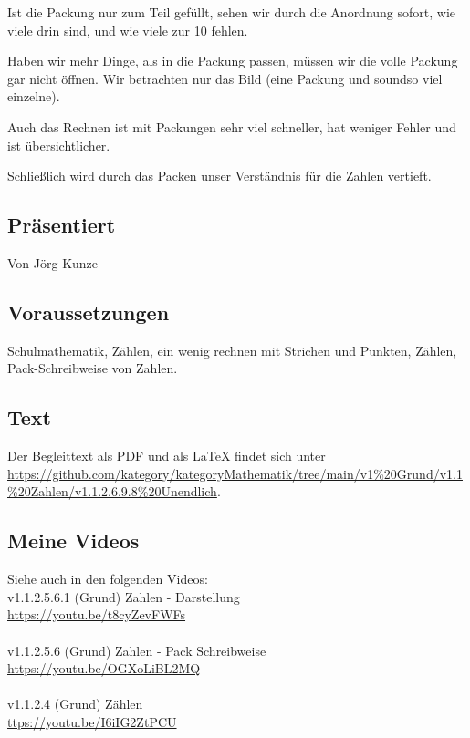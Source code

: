 \documentclass[a4paper]{amsart}
\theoremstyle{definition}
\begin{document}
Ist die Packung nur zum Teil gefüllt, sehen wir durch die Anordnung sofort, wie viele drin sind, und wie viele zur 10 fehlen.

Haben wir mehr Dinge, als in die Packung passen, müssen wir die volle Packung gar nicht öffnen. Wir betrachten nur das Bild (eine Packung und soundso viel einzelne).

Auch das Rechnen ist mit Packungen sehr viel schneller, hat weniger Fehler und ist übersichtlicher.

Schließlich wird durch das Packen unser Verständnis für die Zahlen vertieft.

\subsection*{Präsentiert}
Von Jörg Kunze

\subsection*{Voraussetzungen}
Schulmathematik, Zählen, ein wenig rechnen mit Strichen und Punkten, Zählen, Pack-Schreibweise von Zahlen.

\subsection*{Text}
Der Begleittext als PDF und als LaTeX findet sich unter\\
{\tiny\url{https://github.com/kategory/kategoryMathematik/tree/main/v1%20Grund/v1.1%20Zahlen/v1.1.2.6.9.8%20Unendlich}}.

\subsection*{Meine Videos}
Siehe auch in den folgenden Videos:\\
v1.1.2.5.6.1 (Grund) Zahlen - Darstellung\\
\url{https://youtu.be/t8cyZevFWFs}\\
\\
v1.1.2.5.6 (Grund) Zahlen - Pack Schreibweise\\
\url{https://youtu.be/OGXoLiBL2MQ}\\
\\
v1.1.2.4 (Grund) Zählen\\
\url{ttps://youtu.be/I6iIG2ZtPCU}\\
\end{document}
